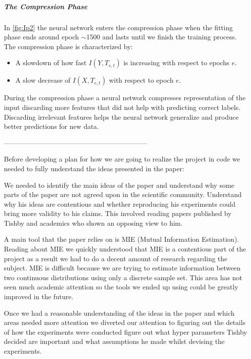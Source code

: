 \documentclass[dissertation.tex]{subfiles}
\begin{document}
\subparagraph{The Compression Phase} In \autoref{fig:Ip2} the neural network
enters the compression phase when the fitting phase ends around epoch $\sim$1500
and lasts until we finish the training process. The compression phase is
characterized by:
\begin{itemize}
  \item{
      A slowdown of how fast $I(Y, T_{e,t})$ is increasing with respect to epochs
      $e$. 
    }
  \item{
      A slow decrease of $I(X, T_{e,t})$ with respect to epoch $e$.
    }
\end{itemize}

During the compression phase a neural network compresses representation of the
input discarding more features that did not help with predicting correct labels.
Discarding irrelevant features helps the neural network generalize and produce
better predictions for new data. 


---------------------------------------------------------------


Before developing a plan for how we are going to realize the project in code we
needed to fully understand the ideas presented in the paper:
\begin{itemize}
    \begin{item}
      We needed to identify the main ideas of the paper and understand why some
      parts of the paper are not agreed upon in the scientific community.
      Understand why his ideas are contentious and whether reproducing his
      experiments could bring more validity to his claims. This involved reading
      papers published by Tishby and academics who shown an opposing view to
      him.
    \end{item}
    \begin{item}
      A main tool that the paper relies on is MIE (Mutual Information
      Estimation). Reading about MIE we quickly understood that MIE is a
      contentious part of the project as a result we had to do a decent amount
      of research regarding the subject. MIE is difficult because we are trying
      to estimate information between two continuous distributions using only a
      discrete sample set. This area has not seen much academic attention so the
      tools we ended up using could be greatly improved in the future.
    \end{item}
\end{itemize}

Once we had a reasonable understanding of the ideas in the paper and which areas
needed more attention we diverted our attention to figuring out the details of
how the experiments were conducted figure out what hyper parameters Tishby
decided are important and what assumptions he made whilst devising the
experiments. 
\end{document}
